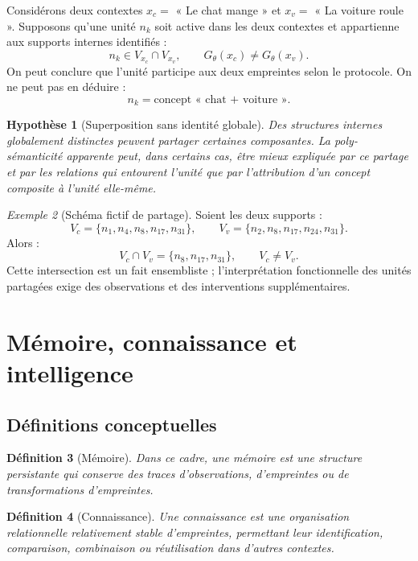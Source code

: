 \documentclass[11pt,a4paper]{article}
\newtheorem{definition}{Définition}[section]
\newtheorem{hypothesis}[definition]{Hypothèse}
\theoremstyle{remark}
\newtheorem{example}[definition]{Exemple}
\newcommand{\1}{\mathbf 1}
\begin{document}
Considérons deux contextes $x_c=$ « Le chat mange » et $x_v=$ « La voiture roule ». Supposons qu'une unité $n_k$ soit active dans les deux contextes et appartienne aux supports internes identifiés :
\[
n_k\in V_{x_c}\cap V_{x_v},\qquad G_\theta(x_c)\neq G_\theta(x_v).
\]
On peut conclure que l'unité participe aux deux empreintes selon le protocole. On ne peut pas en déduire :
\[
n_k=\text{concept « chat + voiture »}.
\]

\begin{hypothesis}[Superposition sans identité globale]
Des structures internes globalement distinctes peuvent partager certaines composantes. La poly-sémanticité apparente peut, dans certains cas, être mieux expliquée par ce partage et par les relations qui entourent l'unité que par l'attribution d'un concept composite à l'unité elle-même.
\end{hypothesis}

\begin{example}[Schéma fictif de partage]
Soient les deux supports :
\[
V_c=\{n_1,n_4,n_8,n_{17},n_{31}\},\qquad V_v=\{n_2,n_8,n_{17},n_{24},n_{31}\}.
\]
Alors :
\[V_c\cap V_v=\{n_8,n_{17},n_{31}\},\qquad V_c\neq V_v.\]
Cette intersection est un fait ensembliste ; l'interprétation fonctionnelle des unités partagées exige des observations et des interventions supplémentaires.
\end{example}

\section{Mémoire, connaissance et intelligence}

\subsection{Définitions conceptuelles}
\begin{definition}[Mémoire]
Dans ce cadre, une mémoire est une structure persistante qui conserve des traces d'observations, d'empreintes ou de transformations d'empreintes.
\end{definition}

\begin{definition}[Connaissance]
Une connaissance est une organisation relationnelle relativement stable d'empreintes, permettant leur identification, comparaison, combinaison ou réutilisation dans d'autres contextes.
\end{definition}
\end{document}
